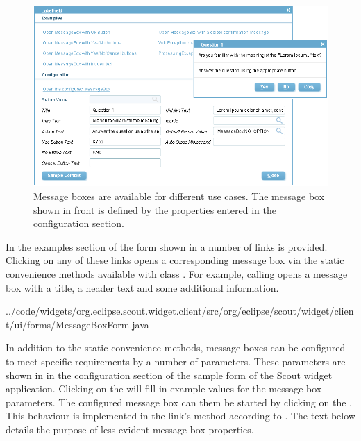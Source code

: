 \documentclass[a4paper,10pt,twoside]{book}
\begin{document}
{\begin{figure}
\includegraphics[width=14cm]{messagebox.png}
\caption{Message boxes are available for different use cases.
The message box shown in front is defined by the properties entered in the configuration section.}
\end{figure}

In the examples section of the  form shown in  a number of links is provided. 
Clicking on any of these links opens a corresponding message box via the static convenience methods available with class . 
For example, calling  opens a message box with a title, a header text and some additional information. 


{../code/widgets/org.eclipse.scout.widget.client/src/org/eclipse/scout/widget/client/ui/forms/MessageBoxForm.java}

In addition to the static convenience methods, message boxes can be configured to meet specific requirements by a number of parameters. 
These parameters are shown in  in the configuration section of the sample form  of the Scout widget application.  
Clicking on the  will fill in example values for the message box parameters. 
The configured message box can them be started by clicking on the . 
This behaviour is implemented in the link's  method according to . 
The text below details the purpose of less evident message box properties.

}
\end{document}
